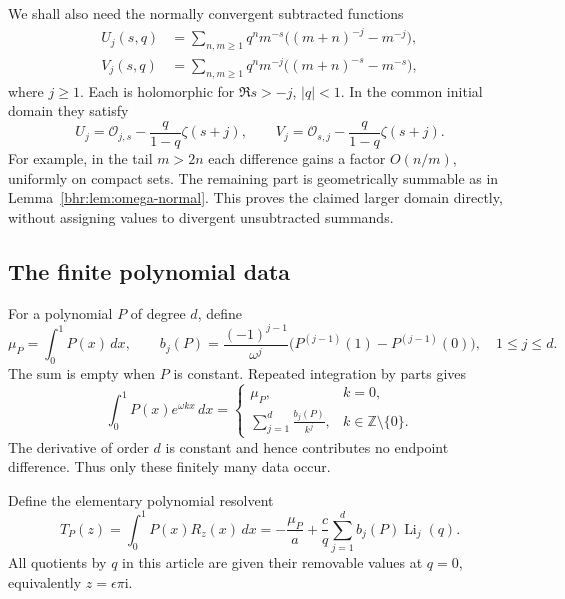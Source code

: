 \documentclass[11pt]{article}
\numberwithin{equation}{section}
\theoremstyle{plain}
\theoremstyle{definition}
\theoremstyle{remark}
\DeclareMathOperator{\Li}{Li}
\newcommand{\Z}{\mathbb Z}
\newcommand{\ii}{\mathrm i}
\begin{document}
We shall also need the normally convergent subtracted functions
\begin{align}
 U_j(s,q)&=\sum_{n,m\ge1}q^n m^{-s}
       \bigl((m+n)^{-j}-m^{-j}\bigr),\label{bhr:eq:U}\\
 V_j(s,q)&=\sum_{n,m\ge1}q^n m^{-j}
       \bigl((m+n)^{-s}-m^{-s}\bigr),\label{bhr:eq:V}
\end{align}
where $j\ge1$. Each is holomorphic for $\Re s>-j$, $|q|<1$.
In the common initial domain they satisfy
\begin{equation}\label{bhr:eq:UV-continuation}
 U_j=\mathcal O_{j,s}-\frac{q}{1-q}\zeta(s+j),\qquad
 V_j=\mathcal O_{s,j}-\frac{q}{1-q}\zeta(s+j).
\end{equation}
For example, in the tail $m>2n$ each difference gains a factor
$O(n/m)$, uniformly on compact sets. The remaining part is
geometrically summable as in Lemma~\ref{bhr:lem:omega-normal}.
This proves the claimed larger domain directly, without assigning
values to divergent unsubtracted summands.

\subsection{The finite polynomial data}

For a polynomial $P$ of degree $d$, define
\begin{equation}\label{bhr:eq:polynomial-data}
 \mu_P=\int_0^1P(x)\,dx,\qquad
 b_j(P)=\frac{(-1)^{j-1}}{\omega^j}
    \bigl(P^{(j-1)}(1)-P^{(j-1)}(0)\bigr),\quad 1\le j\le d.
\end{equation}
The sum is empty when $P$ is constant. Repeated integration by
parts gives
\begin{equation}\label{bhr:eq:P-fourier}
 \int_0^1P(x)e^{\omega kx}\,dx
 =\begin{cases}
   \mu_P,& k=0,\\[2pt]
   \displaystyle\sum_{j=1}^d\frac{b_j(P)}{k^j},& k\in\Z\setminus\{0\}.
  \end{cases}
\end{equation}
The derivative of order $d$ is constant and hence contributes no
endpoint difference. Thus only these finitely many data occur.

Define the elementary polynomial resolvent
\begin{equation}\label{bhr:eq:Tpoly}
 T_P(z)=\int_0^1P(x)R_z(x)\,dx
       =-\frac{\mu_P}{a}+
          \frac cq\sum_{j=1}^d b_j(P)\Li_j(q).
\end{equation}
All quotients by $q$ in this article are given their removable
values at $q=0$, equivalently $z=\epsilon\pi\ii$.
\end{document}
